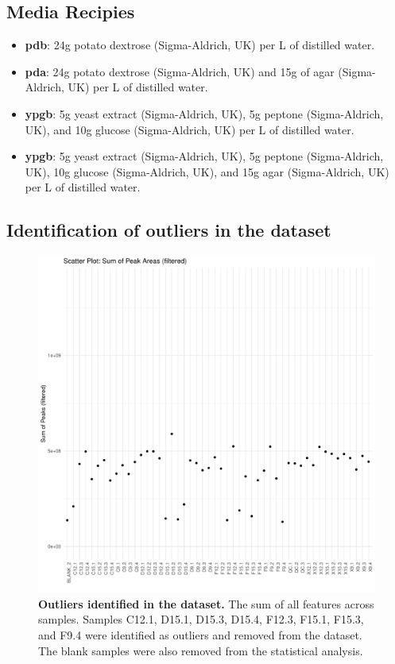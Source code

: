 \subsection{Media Recipies}
\label{apx:mediaRecipies}

\begin{itemize}
    \item \textbf{\Acf{pdb}}: 24g potato dextrose (Sigma-Aldrich, UK) per L of distilled water.
    \item \textbf{\Acf{pda}}: 24g potato dextrose (Sigma-Aldrich, UK)  and 15g of agar (Sigma-Aldrich, UK) per L of distilled water.  
    \item \textbf{\Acf{ypgb}}: 5g yeast extract (Sigma-Aldrich, UK), 5g peptone (Sigma-Aldrich, UK), and 10g glucose  (Sigma-Aldrich, UK) per L of distilled water. 
    \item \textbf{\Acf{ypgb}}: 5g yeast extract (Sigma-Aldrich, UK), 5g peptone (Sigma-Aldrich, UK), 10g glucose (Sigma-Aldrich, UK), and 15g agar (Sigma-Aldrich, UK) per L of distilled water.
\end{itemize}

\newpage
\subsection{Identification of outliers in the dataset}
\label{apx:outliers}

\begin{figure}[hp!]
    \centering
    \includegraphics[width=\textwidth]{Appendices/sum_plot-filtered.pdf}
    \caption[Outliers identified in the dataset] {\textbf{Outliers identified in the dataset.} The sum of all features across samples. Samples C12.1, D15.1, D15.3, D15.4, F12.3, F15.1, F15.3, and F9.4 were identified as outliers and removed from the dataset. The blank samples were also removed from the statistical analysis.} 
    \label{fig:SampleSumPlot}
\end{figure}


